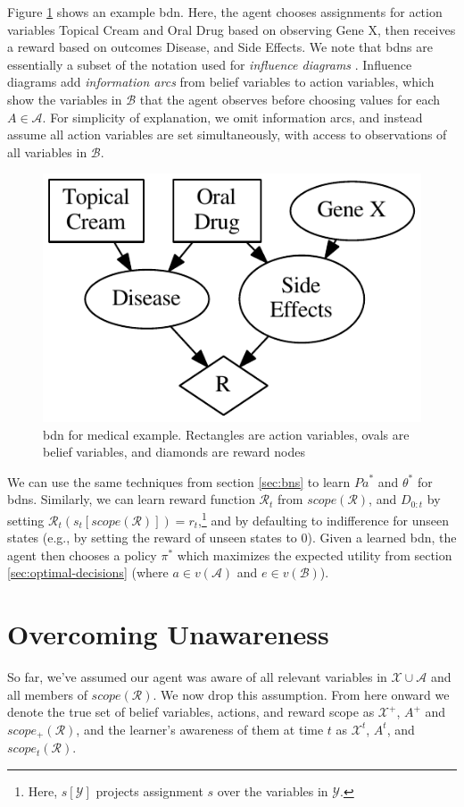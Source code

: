 \documentclass{article}
\newcommand{\bdn}{{\sc bdn}}
\newcommand{\Pa}{\mathit{Pa}}
\begin{document}
	Figure \ref{fig:bdn-example} shows an example \bdn{}. Here, the agent chooses assignments for action variables {\sc Topical Cream} and {\sc Oral Drug } based on observing { \sc Gene X}, then receives a reward based on outcomes { \sc Disease}, and {\sc Side Effects}. We note that \bdn{}s are essentially a subset of the notation used for \emph{influence diagrams} \cite{howard_influence_2005}. Influence diagrams add \emph{information arcs} from belief variables to action variables, which show the variables in $\mathcal{B}$ that the agent observes before choosing values for each $A \in \mathcal{A}$. For simplicity of explanation, we omit information arcs, and instead assume all action variables are set simultaneously, with access to observations of all variables in $\mathcal{B}$.
	
	\begin{figure}
		\centering
		\includegraphics[width=0.5\linewidth]{dnMedicine}
		\caption{\bdn{} for medical example. Rectangles are action variables, ovals are belief variables, and diamonds are reward nodes}
		\label{fig:bdn-example}
	\end{figure}

	We can use the same techniques from section \ref{sec:bns} to learn $\Pa^*$ and $\theta^*$ for \bdn{}s. Similarly, we can learn reward function $\mathcal{R}_t$ from $scope(\mathcal{R})$, and $D_{0:t}$ by setting $\mathcal{R}_t(s_t[scope(\mathcal{R})]) = r_t$,\footnote{Here, $s[\mathcal{Y}]$ projects assignment $s$ over the variables in $\mathcal{Y}$.} and by defaulting to indifference for unseen states (e.g., by setting the reward of unseen states to 0). Given a learned \bdn{}, the agent then chooses a policy $\pi^*$ which maximizes the expected utility from section \ref{sec:optimal-decisions} (where $a \in v(\mathcal{A})$ and $e \in v(\mathcal{B})$).
	
	\section{Overcoming Unawareness}	
	So far, we've assumed our agent was aware of all relevant variables in $\mathcal{X} \cup \mathcal{A}$ and all members of $scope(\mathcal{R})$. We now drop this assumption. From here onward we denote the true set of belief variables, actions, and reward scope as $\mathcal{X}^+$, $A^+$ and $scope_+(\mathcal{R})$, and the learner's awareness of them at time $t$ as  $\mathcal{X}^t$, $A^t$, and $scope_t(\mathcal{R})$.
	
\end{document}
